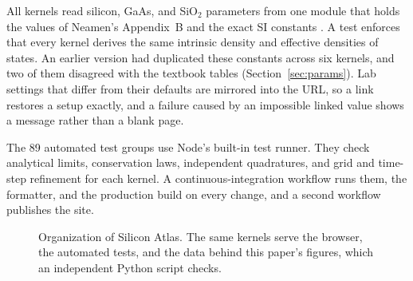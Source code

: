 \documentclass[conference]{IEEEtran}
\begin{document}
All kernels read silicon, GaAs, and SiO$_2$ parameters from one module that holds the values of Neamen's Appendix~B \cite{neamen2012} and the exact SI constants \cite{codata2018}. A test enforces that every kernel derives the same intrinsic density and effective densities of states. An earlier version had duplicated these constants across six kernels, and two of them disagreed with the textbook tables (Section~\ref{sec:params}). Lab settings that differ from their defaults are mirrored into the URL, so a link restores a setup exactly, and a failure caused by an impossible linked value shows a message rather than a blank page.

The 89 automated test groups use Node's built-in test runner. They check analytical limits, conservation laws, independent quadratures, and grid and time-step refinement for each kernel. A continuous-integration workflow runs them, the formatter, and the production build on every change, and a second workflow publishes the site.

\begin{figure}[t]
\centering
{}
\caption{Organization of Silicon Atlas. The same kernels serve the browser, the automated tests, and the data behind this paper's figures, which an independent Python script checks.}
\label{fig:arch}
\end{figure}
\end{document}
